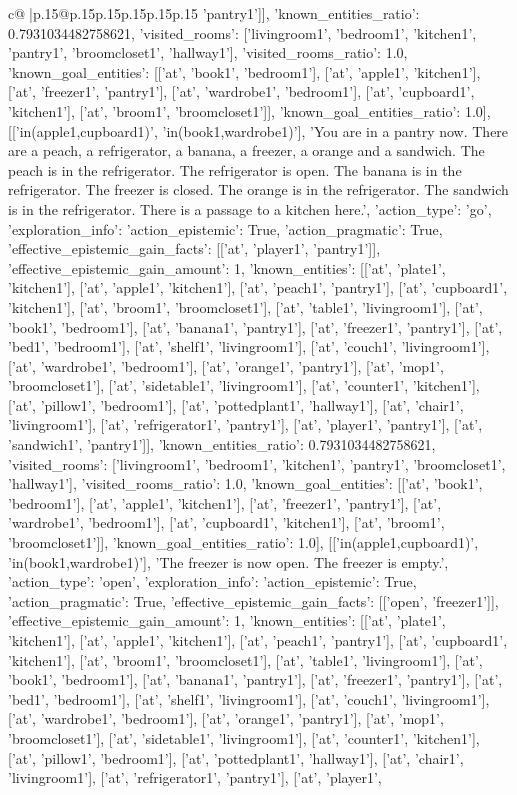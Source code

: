 \documentclass{article}
\begin{document}
{\begin{supertabular}{c@{$\;$}|p{.15\linewidth}@{}p{.15\linewidth}p{.15\linewidth}p{.15\linewidth}p{.15\linewidth}p{.15\linewidth}}
{{{'pantry1']], 'known_entities_ratio': 0.7931034482758621, 'visited_rooms': ['livingroom1', 'bedroom1', 'kitchen1', 'pantry1', 'broomcloset1', 'hallway1'], 'visited_rooms_ratio': 1.0, 'known_goal_entities': [['at', 'book1', 'bedroom1'], ['at', 'apple1', 'kitchen1'], ['at', 'freezer1', 'pantry1'], ['at', 'wardrobe1', 'bedroom1'], ['at', 'cupboard1', 'kitchen1'], ['at', 'broom1', 'broomcloset1']], 'known_goal_entities_ratio': 1.0}}], [['in(apple1,cupboard1)', 'in(book1,wardrobe1)'], 'You are in a pantry now. There are a peach, a refrigerator, a banana, a freezer, a orange and a sandwich. The peach is in the refrigerator. The refrigerator is open. The banana is in the refrigerator. The freezer is closed. The orange is in the refrigerator. The sandwich is in the refrigerator. There is a passage to a kitchen here.', {'action_type': 'go', 'exploration_info': {'action_epistemic': True, 'action_pragmatic': True, 'effective_epistemic_gain_facts': [['at', 'player1', 'pantry1']], 'effective_epistemic_gain_amount': 1, 'known_entities': [['at', 'plate1', 'kitchen1'], ['at', 'apple1', 'kitchen1'], ['at', 'peach1', 'pantry1'], ['at', 'cupboard1', 'kitchen1'], ['at', 'broom1', 'broomcloset1'], ['at', 'table1', 'livingroom1'], ['at', 'book1', 'bedroom1'], ['at', 'banana1', 'pantry1'], ['at', 'freezer1', 'pantry1'], ['at', 'bed1', 'bedroom1'], ['at', 'shelf1', 'livingroom1'], ['at', 'couch1', 'livingroom1'], ['at', 'wardrobe1', 'bedroom1'], ['at', 'orange1', 'pantry1'], ['at', 'mop1', 'broomcloset1'], ['at', 'sidetable1', 'livingroom1'], ['at', 'counter1', 'kitchen1'], ['at', 'pillow1', 'bedroom1'], ['at', 'pottedplant1', 'hallway1'], ['at', 'chair1', 'livingroom1'], ['at', 'refrigerator1', 'pantry1'], ['at', 'player1', 'pantry1'], ['at', 'sandwich1', 'pantry1']], 'known_entities_ratio': 0.7931034482758621, 'visited_rooms': ['livingroom1', 'bedroom1', 'kitchen1', 'pantry1', 'broomcloset1', 'hallway1'], 'visited_rooms_ratio': 1.0, 'known_goal_entities': [['at', 'book1', 'bedroom1'], ['at', 'apple1', 'kitchen1'], ['at', 'freezer1', 'pantry1'], ['at', 'wardrobe1', 'bedroom1'], ['at', 'cupboard1', 'kitchen1'], ['at', 'broom1', 'broomcloset1']], 'known_goal_entities_ratio': 1.0}}], [['in(apple1,cupboard1)', 'in(book1,wardrobe1)'], 'The freezer is now open. The freezer is empty.', {'action_type': 'open', 'exploration_info': {'action_epistemic': True, 'action_pragmatic': True, 'effective_epistemic_gain_facts': [['open', 'freezer1']], 'effective_epistemic_gain_amount': 1, 'known_entities': [['at', 'plate1', 'kitchen1'], ['at', 'apple1', 'kitchen1'], ['at', 'peach1', 'pantry1'], ['at', 'cupboard1', 'kitchen1'], ['at', 'broom1', 'broomcloset1'], ['at', 'table1', 'livingroom1'], ['at', 'book1', 'bedroom1'], ['at', 'banana1', 'pantry1'], ['at', 'freezer1', 'pantry1'], ['at', 'bed1', 'bedroom1'], ['at', 'shelf1', 'livingroom1'], ['at', 'couch1', 'livingroom1'], ['at', 'wardrobe1', 'bedroom1'], ['at', 'orange1', 'pantry1'], ['at', 'mop1', 'broomcloset1'], ['at', 'sidetable1', 'livingroom1'], ['at', 'counter1', 'kitchen1'], ['at', 'pillow1', 'bedroom1'], ['at', 'pottedplant1', 'hallway1'], ['at', 'chair1', 'livingroom1'], ['at', 'refrigerator1', 'pantry1'], ['at', 'player1', }}}
\end{supertabular}}
\end{document}
